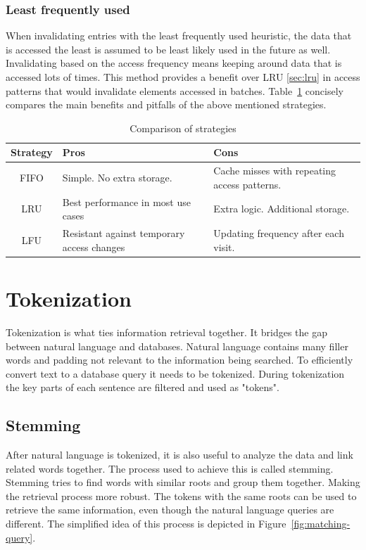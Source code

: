 \documentclass[10pt,twoside,a4paper]{article}
\begin{document}
\subsubsection{Least frequently used}
When invalidating entries with the least frequently used heuristic, the data that is accessed the least is assumed to be least likely used in the future as well\cite{chand2019comparative}. Invalidating based on the access frequency means keeping around data that is accessed lots of times. This method provides a benefit over LRU \ref{sec:lru}\cite{comparison-cache-replacement} in access patterns that would invalidate elements accessed in batches. Table~\ref{tab:cache-strategy-comparison} concisely compares the main benefits and pitfalls of the above mentioned strategies.

\begin{table}[h]
    \centering
    \begin{tabular}{|c|p{4cm}|p{4cm}|}
        \hline
        Strategy & Pros & Cons \\
        \hline
        FIFO & Simple. No extra storage. & Cache misses with repeating access patterns.\\
        \hline
        LRU & Best performance in most use cases & Extra logic. Additional storage.\\
        \hline
        LFU & Resistant against temporary access changes & Updating frequency after each visit.\\
        \hline
    \end{tabular}
    \caption{Comparison of strategies}
    \label{tab:cache-strategy-comparison}
\end{table}

\section{Tokenization}
Tokenization\cite{Effective-Tokenization} is what ties information retrieval together. It bridges the gap between natural language and databases. 
Natural language contains many filler words and padding not relevant to the information being searched. To efficiently convert text to a database query it needs to be tokenized. During tokenization the key parts of each sentence are filtered and used as "tokens".
\subsection{Stemming}
After natural language is tokenized, it is also useful to analyze the data and link related words together. The process used to achieve this is called stemming. Stemming tries to find words with similar roots and group them together. Making the retrieval process more robust. The tokens with the same roots can be used to retrieve the same information, even though the natural language queries are different. The simplified idea of this process is depicted in Figure~\ref{fig:matching-query}.
\end{document}

